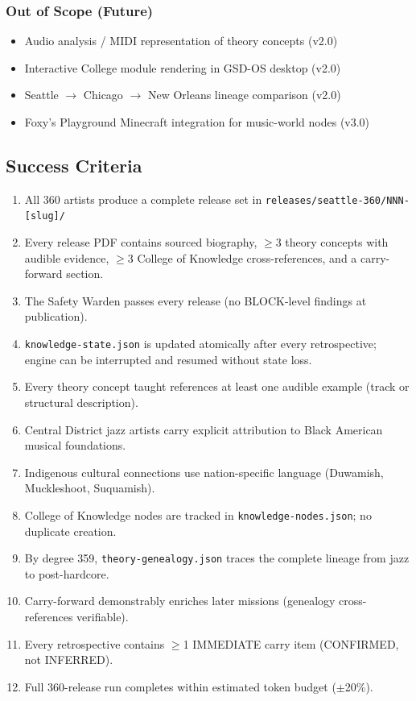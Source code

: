 \documentclass[11pt,letterpaper]{article}
\begin{document}
\subsubsection{Out of Scope (Future)}
\begin{itemize}[leftmargin=2em]
  \item Audio analysis / MIDI representation of theory concepts (v2.0)
  \item Interactive College module rendering in GSD-OS desktop (v2.0)
  \item Seattle $\rightarrow$ Chicago $\rightarrow$ New Orleans lineage comparison (v2.0)
  \item Foxy's Playground Minecraft integration for music-world nodes (v3.0)
\end{itemize}

\subsection{Success Criteria}

\begin{enumerate}[leftmargin=2em]
  \item All 360 artists produce a complete release set in \texttt{releases/seattle-360/NNN-[slug]/}
  \item Every release PDF contains sourced biography, $\geq$3 theory concepts with audible evidence,
        $\geq$3 College of Knowledge cross-references, and a carry-forward section.
  \item The Safety Warden passes every release (no BLOCK-level findings at publication).
  \item \texttt{knowledge-state.json} is updated atomically after every retrospective; engine
        can be interrupted and resumed without state loss.
  \item Every theory concept taught references at least one audible example (track or structural description).
  \item Central District jazz artists carry explicit attribution to Black American musical foundations.
  \item Indigenous cultural connections use nation-specific language (Duwamish, Muckleshoot, Suquamish).
  \item College of Knowledge nodes are tracked in \texttt{knowledge-nodes.json}; no duplicate creation.
  \item By degree 359, \texttt{theory-genealogy.json} traces the complete lineage from jazz to post-hardcore.
  \item Carry-forward demonstrably enriches later missions (genealogy cross-references verifiable).
  \item Every retrospective contains $\geq$1 IMMEDIATE carry item (CONFIRMED, not INFERRED).
  \item Full 360-release run completes within estimated token budget ($\pm$20\%).
\end{enumerate}
\end{document}
